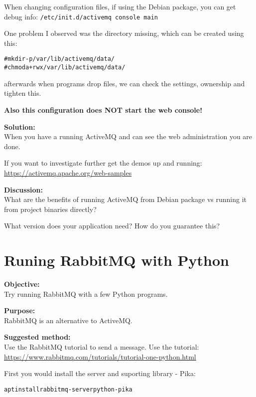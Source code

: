 \documentclass[a4paper,11pt,notitlepage]{report}
\begin{document}
When changing configuration files, if using the Debian package, you can get debug info:
\verb+/etc/init.d/activemq console main+

One problem I observed was the directory missing, which can be created using this:
\begin{alltt}
# mkdir -p  /var/lib/activemq/data/
# chmod a+rwx  /var/lib/activemq/data/
\end{alltt}

afterwards when programs drop files, we can check the settings, ownership and tighten this.

{\bf Also this configuration does NOT start the web console!}

{\bf Solution:}\\
When you have a running ActiveMQ and can see the web administration you are done.

If you want to investigate further get the demos up and running:\\
\url{https://activemq.apache.org/web-samples}

{\bf Discussion:}\\
What are the benefits of running ActiveMQ from Debian package vs running it from project binaries directly?

What version does your application need? How do you guarantee this?







\chapter{Runing RabbitMQ with Python}
\label{ex:rabbitmq-install}


{\bf Objective:}\\
Try running RabbitMQ with a few Python programs.

{\bf Purpose:}\\
RabbitMQ is an alternative to ActiveMQ.

{\bf Suggested method:}\\
Use the RabbitMQ tutorial to send a message. Use the tutorial:\\
\url{https://www.rabbitmq.com/tutorials/tutorial-one-python.html}

First you would install the server and suporting library - Pika:
\begin{alltt}
apt install rabbitmq-server python-pika
\end{alltt}
\end{document}
